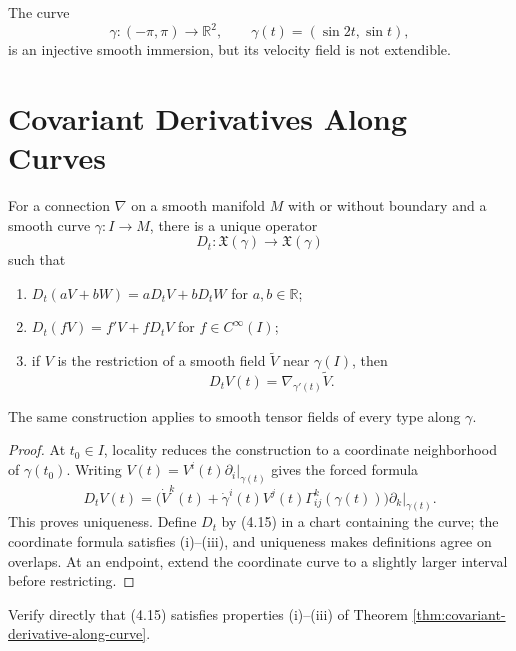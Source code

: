 \begin{example}
\label{ex:figure-eight-curve}
The curve
\[
\gamma\colon(-\pi,\pi)\to\mathbb R^2,
\qquad \gamma(t)=(\sin 2t,\sin t),
\]
is an injective smooth immersion, but its velocity field is not extendible.
\end{example}

\section{Covariant Derivatives Along Curves}

\begin{theorem}
\label{thm:covariant-derivative-along-curve}
For a connection $\nabla$ on a smooth manifold $M$ with or without boundary and
a smooth curve $\gamma\colon I\to M$, there is a unique operator
\[
D_t\colon\mathfrak{X}(\gamma)\to\mathfrak{X}(\gamma)
\]
such that
\begin{enumerate}
\item[(i)] $D_t(aV+bW)=aD_tV+bD_tW$ for $a,b\in\mathbb R$;
\item[(ii)] $D_t(fV)=f'V+fD_tV$ for $f\in C^\infty(I)$;
\item[(iii)] if $V$ is the restriction of a smooth field $\widetilde V$ near
$\gamma(I)$, then
\[
D_tV(t)=\nabla_{\gamma'(t)}\widetilde V.
\]
\end{enumerate}
The same construction applies to smooth tensor fields of every type along
$\gamma$.
\end{theorem}
\begin{proof}
\sketch At $t_0\in I$, locality reduces the construction to a coordinate
neighborhood of $\gamma(t_0)$. Writing
$V(t)=V^i(t)\partial_i|_{\gamma(t)}$ gives the forced formula
\begin{equation}
D_tV(t)=\bigl(\dot V^k(t)+\dot\gamma^i(t)V^j(t)\Gamma^k_{ij}(\gamma(t))\bigr)
\partial_k|_{\gamma(t)}.\tag{4.15}
\end{equation}
This proves uniqueness. Define $D_t$ by (4.15) in a chart containing the curve;
the coordinate formula satisfies (i)--(iii), and uniqueness makes definitions
agree on overlaps. At an endpoint, extend the coordinate curve to a slightly
larger interval before restricting.
\end{proof}

\begin{exercise}
\label{exer:covariant-derivative-properties}
Verify directly that (4.15) satisfies properties (i)--(iii) of Theorem
\ref{thm:covariant-derivative-along-curve}.
\end{exercise}

